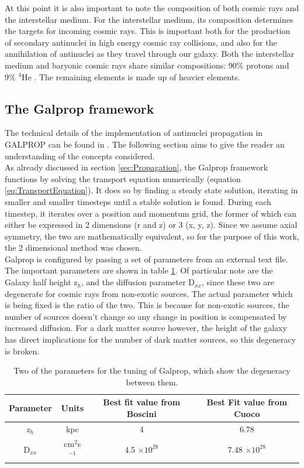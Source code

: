 At this point it is also important to note the composition of both cosmic rays and the interstellar medium. For the interstellar medium, its composition determines the targets for incoming cosmic rays. This is important both for the production of secondary antinuclei in high energy cosmic ray collisions, and also for the annihilation of antinuclei as they travel through our galaxy. Both the interstellar medium and baryonic cosmic rays share similar compositions: 90\% protons and 9\% $^4\mathrm{He}$ \cite{ISM_composition}. The remaining elements is made up of heavier elements. 
\subsection{The Galprop framework}\label{sec:GALPROP}
The technical details of the implementation of antinuclei propagation in GALPROP can be found in \cite{ALICE-PUBLIC-2022-002}. The following section aims to give the reader an understanding of the concepts considered.\\

As already discussed in section \ref{sec:Propagation}, the Galprop framework functions by solving the transport equation numerically (equation \ref{eq:TransportEquation}). It does so by finding a steady state solution, iterating in smaller and smaller timesteps until a stable solution is found. During each timestep, it iterates over a position and momentum grid, the former of which can either be expressed in 2 dimensions (r and z) or 3 (x, y, z). Since we assume axial symmetry, the two are mathematically equivalent, so for the purpose of this work, the 2 dimensional method was chosen. \\

Galprop is configured by passing a set of parameters from an external text file. The important parameters are shown in table \ref{tab:GalpropParameters}. Of particular note are the Galaxy half height z$_h$, and the diffusion parameter D$_{xx}$, since these two are degenerate for cosmic rays from non-exotic sources. The actual parameter which is being fixed is the ratio of the two. This is because for non-exotic sources, the number of sources doesn't change so any change in position is compensated by increased diffusion. For a dark matter source however, the height of the galaxy has direct implications for the number of dark matter sources, so this degeneracy is broken.\\


\begin{table}[h]
    \centering
    \begin{tabular}{|c|c|c|c|}
        \hline
        Parameter &  Units & Best fit value from Boscini & Best Fit value from Cuoco \\
        \hline
        z$_h$  & kpc &  4 & 6.78 \\
        \hline
        D$_{xx}$ & cm$^2$s$^{-1}$& 4.5 $\times 10^{28}$ & 7.48 $\times 10^{28}$ \\
        \hline
    \end{tabular}
    \caption{Two of the parameters for the tuning of Galprop, which show the degeneracy between them.}
    \label{tab:GalpropParameters}
\end{table}

